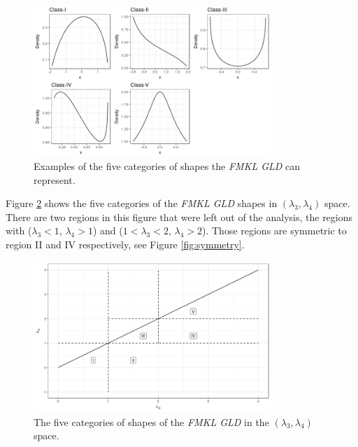 \begin{figure}[H]
    \centering
    \includegraphics[width=0.8\textwidth]{img/gld/fmkl_classes.png}
    \caption{Examples of the five categories of shapes the \textit{FMKL GLD} can represent.}
    \label{fig:fmkl_classes}
\end{figure}

Figure \ref{fig:fmkl_classes_l3_l4} shows the five categories of the \textit{FMKL GLD} shapes in $(\lambda_{3}, \lambda_{4})$ space. There are two regions in this figure that were left out of the analysis, the regions with ($\lambda_{3}<1$, $\lambda_{4}>1$) and ($1<\lambda_{3}<2$, $\lambda_{4}>2$). Those regions are symmetric to region II and IV respectively, see Figure \ref{fig:symmetry}.

\begin{figure}[H]
    \centering
    \includegraphics[width=0.8\textwidth]{img/gld/classes_l3_l4.png}
    \caption{The five categories of shapes of the \textit{FMKL GLD} in the $(\lambda_{3}, \lambda_{4})$ space.}
    \label{fig:fmkl_classes_l3_l4}
\end{figure}

